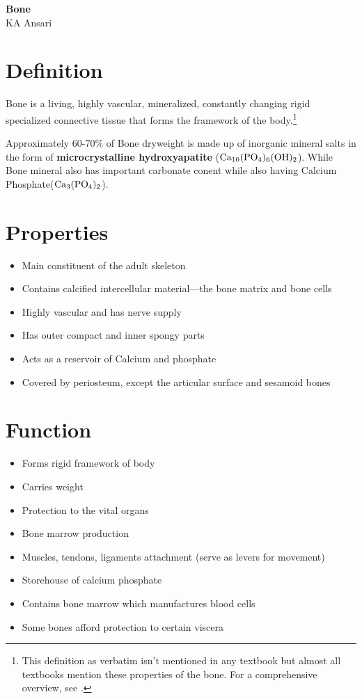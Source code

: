 \documentclass[11pt]{article}
\renewcommand{\maketitle}{
    \begin{center}
        {\LARGE \bfseries Bone} \\[0.5em]
        {\large KA Ansari} \\[1em]
    \end{center}
}
\begin{document}
\maketitle

\tableofcontents
\newpage

\section{Definition}
Bone is a living, highly vascular, mineralized, constantly changing rigid specialized connective tissue that forms the framework of the body.\footnote{This definition as verbatim isn't mentioned in any textbook but almost all textbooks mention these properties of the bone. For a comprehensive overview, see \cite[p.~88]{gray2020}.}

Approximately 60-70\% of Bone dryweight is made up of inorganic mineral salts in the form of \textbf{microcrystalline hydroxyapatite} ($\ce{Ca10(PO4)6(OH)2}$). While Bone mineral also has important carbonate conent while also having Calcium Phosphate($\ce{Ca3(PO4)2}$)\cite[p.~90]{gray2020}.


\section{Properties}
\begin{itemize}
    \item Main constituent of the adult skeleton
    \item Contains calcified intercellular material—the bone matrix and bone cells
    \item Highly vascular and has nerve supply
    \item Has outer compact and inner spongy parts
    \item Acts as a reservoir of Calcium and phosphate
    \item Covered by periosteum, except the articular surface and sesamoid bones
\end{itemize}

\section{Function}
\begin{itemize}
    \item Forms rigid framework of body
    \item Carries weight
    \item Protection to the vital organs
    \item Bone marrow production
    \item Muscles, tendons, ligaments attachment (serve as levers for movement)
    \item Storehouse of calcium phosphate
    \item Contains bone marrow which manufactures blood cells
    \item Some bones afford protection to certain viscera
\end{itemize}
\end{document}
